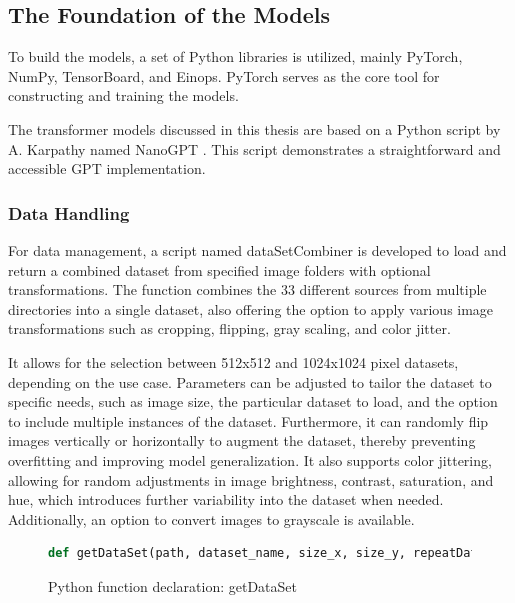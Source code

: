
    \subsection{The Foundation of the Models}

    To build the models, a set of Python libraries is utilized, mainly PyTorch, NumPy, TensorBoard, and Einops. PyTorch serves as the core tool for constructing and training the models.
    
    The transformer models discussed in this thesis are based on a Python script by A. Karpathy named NanoGPT \autocite{nanoGPTkarpathy2023}. This script demonstrates a straightforward and accessible GPT implementation. 
    
    \subsubsection{Data Handling}
    \label{sec:DataHandling}

    For data management, a script named dataSetCombiner is developed to load and return a combined dataset from specified image folders with optional transformations. The function combines the 33 different sources from multiple directories into a single dataset, also offering the option to apply various image transformations such as cropping, flipping, gray scaling, and color jitter.
    
    It allows for the selection between 512x512 and 1024x1024 pixel datasets, depending on the use case. Parameters can be adjusted to tailor the dataset to specific needs, such as image size, the particular dataset to load, and the option to include multiple instances of the dataset. Furthermore, it can randomly flip images vertically or horizontally to augment the dataset, thereby preventing overfitting and improving model generalization. It also supports color jittering, allowing for random adjustments in image brightness, contrast, saturation, and hue, which introduces further variability into the dataset when needed. Additionally, an option to convert images to grayscale is available.
    

\begin{figure}[H]
\centering
\begin{lstlisting}[language=Python]
    def getDataSet(path, dataset_name, size_x, size_y, repeatData=1, random_vertical_flip=False, random_horizontal_flip=False, crop_type='random', grayscale=False, color_jitter=False, jitter_brightness=0, jitter_contrast=0, jitter_saturation=0, jitter_hue=0):
\end{lstlisting}
\caption{Python function declaration: getDataSet}
\label{fig:getDataSet}
\end{figure}


